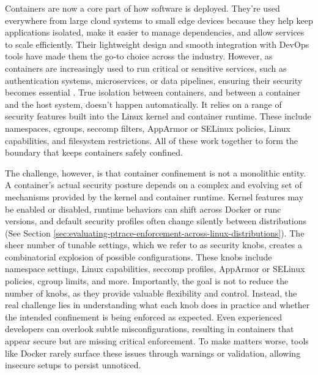 \documentclass[12pt]{report}
\begin{document}
\begin{doublespace}
Containers are now a core part of how software is deployed. They’re used everywhere from large cloud systems to small edge devices because they help keep applications isolated, make it easier to manage dependencies, and allow services to scale efficiently. Their lightweight design and smooth integration with DevOps tools have made them the go-to choice across the industry. However, as containers are increasingly used to run critical or sensitive services, such as authentication systems, microservices, or data pipelines, ensuring their security becomes essential \cite{sultan2019container}. True isolation between containers, and between a container and the host system, doesn’t happen automatically. It relies on a range of security features built into the Linux kernel and container runtime. These include namespaces, cgroups, seccomp filters, AppArmor or SELinux policies, Linux capabilities, and filesystem restrictions. All of these work together to form the boundary that keeps containers safely confined.

The challenge, however, is that container confinement is not a monolithic entity. A container’s actual security posture depends on a complex and evolving set of mechanisms provided by the kernel and container runtime. Kernel features may be enabled or disabled, runtime behaviors can shift across Docker or runc versions, and default security profiles often change silently between distributions (See Section \ref{sec:evaluating-ptrace-enforcement-across-linux-distributions}). The sheer number of tunable settings, which we refer to as security knobs, creates a combinatorial explosion of possible configurations. These knobs include namespace settings, Linux capabilities, seccomp profiles, AppArmor or SELinux policies, cgroup limits, and more. Importantly, the goal is not to reduce the number of knobs, as they provide valuable flexibility and control. Instead, the real challenge lies in understanding what each knob does in practice and whether the intended confinement is being enforced as expected. Even experienced developers can overlook subtle misconfigurations, resulting in containers that appear secure but are missing critical enforcement. To make matters worse, tools like Docker rarely surface these issues through warnings or validation, allowing insecure setups to persist unnoticed.


\end{doublespace}
\end{document}
